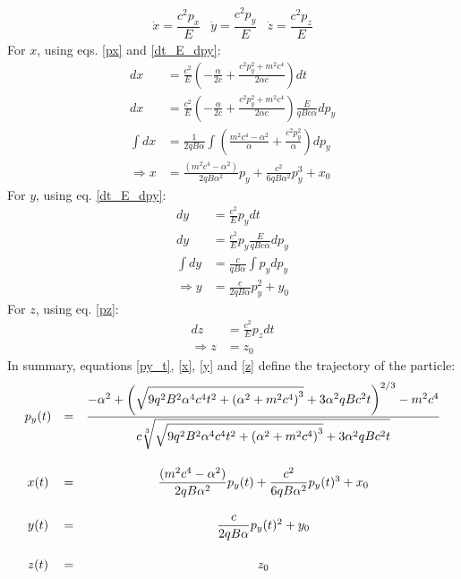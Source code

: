 \documentclass[]{article}
\numberwithin{equation}{section}
\newcommand{\0}{\textcolor{gray}{0}}
\begin{document}
\begin{equation}
	\begin{matrix}
		\dot{x} = \dfrac{c^2 p_x}{E} & \dot{y} = \dfrac{c^2 p_y}{E} & \dot{z} = \dfrac{c^2 p_z}{E}
	\end{matrix}
\end{equation}
For \(x\), using eqs. \ref{px} and \ref{dt_E_dpy}:
\begin{align}
	dx &= \frac{c^2}{E}\left(- \frac{\alpha}{2c} + \frac{c^2p_y^2 + m^2c^4}{2\alpha c}\right) dt\nonumber\\
	dx &= \frac{c^2}{E}\left(- \frac{\alpha}{2c} + \frac{c^2p_y^2 + m^2c^4}{2\alpha c}\right) \frac{E}{q B c \alpha}dp_y\nonumber\\
	\int dx &= \frac{1}{2 q B \alpha}\int \left(\frac{m^2c^4 - \alpha^2}{\alpha} + \frac{c^2p_y^2}{\alpha}\right)dp_y\nonumber\\
	\Rightarrow x &= \frac{(m^2c^4 - \alpha^2)}{2 q B \alpha^2}p_y + \frac{c^2}{6 q B \alpha^2}p_y^3 + x_0 \label{x}
\end{align}
For \(y\), using eq. \ref{dt_E_dpy}:
\begin{align}
	dy &= \frac{c^2}{E}p_y dt\nonumber\\
	dy &= \frac{c^2}{E}p_y \frac{E}{q B c \alpha}dp_y\nonumber\\
	\int dy &= \frac{c}{q B \alpha}\int p_ydp_y\nonumber\\
	\Rightarrow y &= \frac{c}{2 q B \alpha}p_y^2 + y_0\label{y}
\end{align}
For \(z\), using eq. \ref{pz}:
\begin{align}
	dz &= \frac{c^2}{E}p_z dt\nonumber\\
	\Rightarrow z &= z_0\label{z}
\end{align}
In summary, equations \ref{py_t}, \ref{x}, \ref{y} and \ref{z}  define the trajectory of the particle:
\begin{equation*}
	\begin{matrix}
		p_y(t) &=& \dfrac{-\alpha ^2+\left(\sqrt{9 q^2 B^2 \alpha ^4 c^4 t^2 + \left(\alpha ^2 + m^2 c^4 \right)^3}+3 \alpha ^2 q B c^2 t\right)^{2/3} - m^2 c^4}{c \sqrt[3]{\sqrt{9 q^2 B^2 \alpha ^4 c^4 t^2+\left(\alpha ^2 + m^2 c^4 \right)^3}+3 \alpha ^2 q B c^2 t}}\label{py}\vspace{5mm}\\
		x(t) &=& \dfrac{(m^2c^4 - \alpha^2)}{2 q B \alpha^2}p_y(t) + \dfrac{c^2}{6 q B \alpha^2}p_y(t)^3 + x_0\vspace{5mm}\\
		y(t) &=& \dfrac{c}{2 q B \alpha}p_y(t)^2 + y_0\vspace{5mm}\\
		z(t) &=& z_0
	\end{matrix}
\end{equation*}
\end{document}
